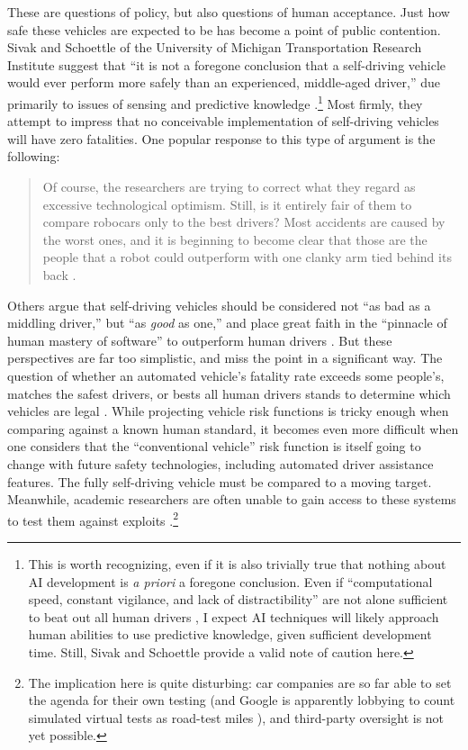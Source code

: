 These are questions of
  policy, but also questions of human acceptance. Just how safe these
  vehicles are expected to be has become a point of 
public contention. Sivak and Schoettle of the
University of Michigan Transportation Research Institute suggest that
``it is not a foregone conclusion that a 
self-driving vehicle would ever perform more safely than an
experienced, middle-aged driver,'' due primarily to issues of sensing and
predictive knowledge \cite[p. 7]{SivakSchoettle}.\footnote{This is worth
recognizing, even if it is also trivially true that nothing about AI
development is \emph{a priori} a foregone conclusion. Even if
``computational speed, constant vigilance, and lack of 
distractibility'' are not alone sufficient to beat out all human
drivers \cite[p. 4]{SivakSchoettle}, I expect AI techniques will
likely approach human 
abilities to use predictive 
knowledge, given sufficient development time. Still, Sivak and
Schoettle provide a valid note of caution here.} Most firmly, they
attempt to impress that no conceivable implementation of self-driving
vehicles will have zero fatalities. One popular response to this type of
argument is the following: 
\begin{quote}Of course, the researchers are trying to correct what they regard as
excessive technological optimism. Still, is it entirely fair of them
to compare robocars only to the best drivers? Most accidents are
caused by the worst ones, and it is beginning to become clear that
those are the people that a robot could outperform with one clanky
arm tied behind its back \cite{rossSafety}.\end{quote} 
Others argue that self-driving vehicles should be considered not ``as
bad as a middling 
driver,'' but ``as \emph{good} as one,'' and place great faith in the
``pinnacle of human mastery of software'' to outperform human drivers \cite{templetonB}.
But these perspectives are far too simplistic, and miss the point in a
significant way. The question of whether an
automated vehicle's fatality rate exceeds some people's, matches the
safest drivers, or bests all human drivers stands to determine which
vehicles are legal \cite[p. 6]{SivakSchoettle}. While projecting vehicle
risk functions is tricky enough when comparing against a known human
standard, it becomes even more difficult when one considers that the
``conventional vehicle'' risk function is itself going to change with
future safety technologies, including automated driver assistance
features. The fully self-driving vehicle must be compared to a moving
target. Meanwhile, academic researchers are often unable to gain access to
these systems to test them against exploits
\cite{madrigalHack}.\footnote{The
implication here is quite disturbing: car companies are so far able to
set the agenda for their own testing (and Google is apparently
lobbying to count simulated virtual tests as road-test miles
\cite{harrisVirtual}),
and third-party oversight is not yet possible.}


